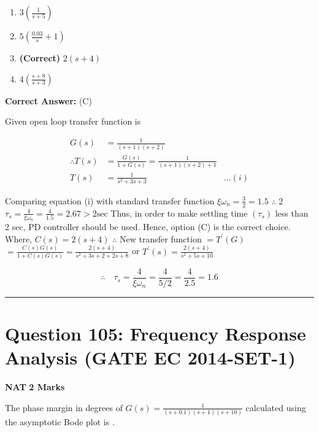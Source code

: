 \documentclass[11pt,a4paper]{article}
\begin{document}
\begin{enumerate}[label=(\Alph*)]
    \item $3 (\frac{1}{s+5})$
    \item $5 (\frac{0.03}{s}+1)$
    \item \textbf{(Correct)} $2 (s+4)$
    \item $4 (\frac{s+8}{s+3})$
\end{enumerate}

\noindent \textbf{Correct Answer:} (C)

\begin{tcolorbox}[solbox, title=Detailed Solution -- Question 104]
Given open loop transfer function is

\[
\begin{aligned} G(s)&=\frac{1}{(s+1)(s+2)} \\ \therefore T(s)&=\frac{G(s)}{1+G(s)}=\frac{1}{(s+1)(s+2)+1} \\ T(s)&=\frac{1}{s^{2}+3 s+3} &\ldots(i) \end{aligned}
\]

 Comparing equation (i) with standard transfer function
$\xi \omega_{n}=\frac{3}{2}=1.5$
$\therefore$ 2%
$\tau_{s}=\frac{4}{\xi \omega_{n}}=\frac{4}{1.5}=2.67>2 \mathrm{sec}$
 Thus, in order to make settling time $\left(\tau_{s}\right)$ less than 2 sec, PD controller should be used. Hence, option (C) is the correct choice. 
 Where, $C(s)=2(s+4)$
$\therefore$ New transfer function $=T^{\prime}(G)$
$=\frac{C(s) G(s)}{1+C(s) G(s)}=\frac{2(s+4)}{s^{2}+3 s+2+2 s+8}$
 or $T^{\prime}(s)=\frac{2(s+4)}{s^{2}+5 s+10}$

\[
\therefore \quad \tau_{s}=\frac{4}{\xi \omega_{n}}=\frac{4}{5 / 2}=\frac{4}{2.5}=1.6
\]
\end{tcolorbox}

\vspace{1.5em}
\hrule
\vspace{1.5em}

\section*{Question 105: Frequency Response Analysis (GATE EC 2014-SET-1)}
\noindent \textbf{\color{primary}NAT} \hfill \textbf{\color{secondary}2 Marks}


\noindent The phase margin in degrees of $G(s)=\frac{1}{(s+0.1)(s+1)(s+10)}$
calculated using the asymptotic Bode plot is \underline{\hspace{1.5cm}}.
\end{document}
